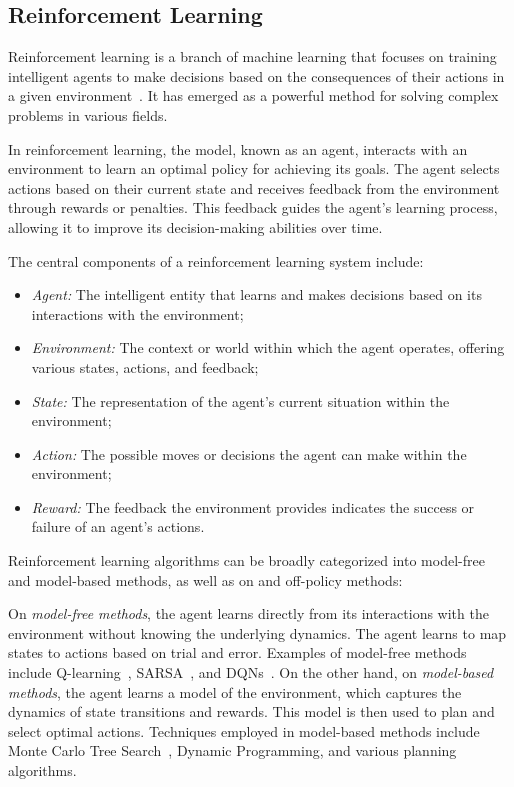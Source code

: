 \subsection{Reinforcement Learning}
\label{subsec:reinforcement-learning}

Reinforcement learning is a branch of machine learning that focuses on training intelligent agents to make decisions based on the consequences of their actions in a given environment~\cite{kaelbling1996}.
It has emerged as a powerful method for solving complex problems in various fields.

In reinforcement learning, the model, known as an agent, interacts with an environment to learn an optimal policy for achieving its goals.
The agent selects actions based on their current state and receives feedback from the environment through rewards or penalties.
This feedback guides the agent's learning process, allowing it to improve its decision-making abilities over time.

The central components of a reinforcement learning system include:

\begin{itemize}
    \item \emph{Agent:} The intelligent entity that learns and makes decisions based on its interactions with the environment;
    \item \emph{Environment:} The context or world within which the agent operates, offering various states, actions, and feedback;
    \item \emph{State:} The representation of the agent's current situation within the environment;
    \item \emph{Action:} The possible moves or decisions the agent can make within the environment;
    \item \emph{Reward:} The feedback the environment provides indicates the success or failure of an agent's actions.
\end{itemize}

Reinforcement learning algorithms can be broadly categorized into model-free and model-based methods, as well as on and off-policy methods:

On \emph{model-free methods}, the agent learns directly from its interactions with the environment without knowing the underlying dynamics.
The agent learns to map states to actions based on trial and error.
Examples of model-free methods include Q-learning~\cite{watkins1992}, SARSA~\cite{rummery1994}, and \ac{DQNs}~\cite{mnih2015}.
On the other hand, on \emph{model-based methods}, the agent learns a model of the environment, which captures the dynamics of state transitions and rewards.
This model is then used to plan and select optimal actions.
Techniques employed in model-based methods include Monte Carlo Tree Search~\cite{browne2012}, Dynamic Programming, and various planning algorithms.

